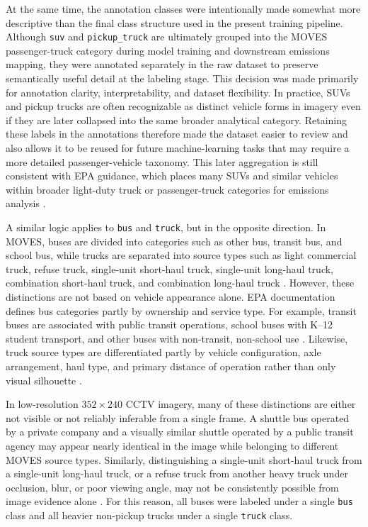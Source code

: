 \FloatBarrier
At the same time, the annotation classes were intentionally made somewhat more 
descriptive than the final class structure used in the present training pipeline. 
Although \verb|suv| and \verb|pickup_truck| are ultimately grouped into the MOVES 
passenger-truck category during model training and downstream emissions mapping, 
they were annotated separately in the raw dataset to preserve semantically useful 
detail at the labeling stage. This decision was made primarily for annotation 
clarity, interpretability, and dataset flexibility. In practice, SUVs and pickup 
trucks are often recognizable as distinct vehicle forms in imagery even if they 
are later collapsed into the same broader analytical category. Retaining these 
labels in the annotations therefore made the dataset easier to review and also 
allows it to be reused for future machine-learning tasks that may require a more 
detailed passenger-vehicle taxonomy. This later aggregation is still consistent 
with EPA guidance, which places many SUVs and similar vehicles within broader 
light-duty truck or passenger-truck categories for emissions analysis 
\cite{USEPA_def_truck_2019, USEPA_road_pop_2020}.

A similar logic applies to \verb|bus| and \verb|truck|, but in the opposite direction. 
In MOVES, buses are divided into categories such as other bus, transit bus, and 
school bus, while trucks are separated into source types such as light commercial 
truck, refuse truck, single-unit short-haul truck, single-unit long-haul truck, 
combination short-haul truck, and combination long-haul truck 
\cite{USDOE_AFDC, USEPA_road_pop_2020}. However, these distinctions are not 
based on vehicle appearance alone. EPA documentation defines bus categories partly 
by ownership and service type. For example, transit buses are associated with 
public transit operations, school buses with K--12 student transport, and other 
buses with non-transit, non-school use \cite{USEPA_road_pop_2020}. Likewise, truck 
source types are differentiated partly by vehicle configuration, axle arrangement, 
haul type, and primary distance of operation rather than only visual silhouette 
\cite{us_epa_moves3_2020}.

In low-resolution $352 \times 240$ CCTV imagery, many of these distinctions are 
either not visible or not reliably inferable from a single frame. A shuttle bus 
operated by a private company and a visually similar shuttle operated by a public 
transit agency may appear nearly identical in the image while belonging to different 
MOVES source types. Similarly, distinguishing a single-unit short-haul truck from 
a single-unit long-haul truck, or a refuse truck from another heavy truck under 
occlusion, blur, or poor viewing angle, may not be consistently possible from image 
evidence alone \cite{USEPA_road_pop_2020, us_epa_moves3_2020}. For this reason, 
all buses were labeled under a single \verb|bus| class and all heavier non-pickup 
trucks under a single \verb|truck| class.

